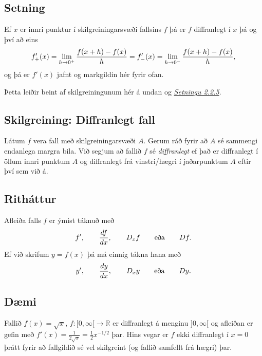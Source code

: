 \documentclass[b5paper,10pt,icelandic]{sphinxmanual}
\begin{document}
\subsection{Setning}
\label{kafli03:id2}
Ef \(x\) er innri punktur í skilgreiningarsvæði fallsins \(f\)
þá er \(f\) diffranlegt í \(x\) þá og því að eins
\begin{gather}
\begin{split}f_+'(x)=\lim_{h\rightarrow 0^+}\frac{f(x+h)-f(x)}{h}
=   f_-'(x)=\lim_{h\rightarrow 0^-}\frac{f(x+h)-f(x)}{h},\end{split}\notag
\end{gather}
og þá er \(f'(x)\) jafnt og markgildin hér fyrir ofan.

Þetta leiðir beint af skilgreiningunum hér á undan og
{\hyperref[kafli02:setning\string-hv\string-markgildi]{\emph{Setningu 2.2.5}}}.


\subsection{Skilgreining: Diffranlegt fall}
\label{kafli03:skilgreining-diffranlegt-fall}\label{kafli03:index-3}
Látum \(f\) vera fall með skilgreiningarsvæði \(A\). Gerum ráð
fyrir að \(A\) sé sammengi endanlega margra bila. Við segjum að
fallið \(f\) sé \emph{diffranlegt} ef það er diffranlegt í öllum innri
punktum \(A\) og diffranlegt frá vinstri/hægri í jaðarpunktum
\(A\) eftir því sem við á.


\subsection{Ritháttur}
\label{kafli03:rithattur}
Afleiða falls \(f\) er ýmist táknuð með
\begin{gather}
\begin{split}f', \qquad \frac {df}{dx}, \qquad D_x f \qquad \text{eða} \qquad Df.\end{split}\notag
\end{gather}
Ef við skrifum \(y=f(x)\) þá má einnig tákna hana með
\begin{gather}
\begin{split}y', \qquad \frac {dy}{dx}, \qquad D_x y \qquad \text{eða} \qquad Dy.\end{split}\notag
\end{gather}

\subsection{Dæmi}
\label{kafli03:id3}
Fallið \(f(x) = \sqrt{x}\), \(f:[0,\infty[\to {{\mathbb  R}}\)
er diffranlegt á menginu \(]0,\infty[\) og afleiðan er gefin með
\(f'(x) = \frac 1{2\sqrt{x}} = \frac 12 x^{-1/2}\) þar. Hins vegar
er \(f\) ekki diffranlegt í \(x=0\) þrátt fyrir að fallgildið sé
vel skilgreint (og fallið samfellt frá hægri) þar.
\end{document}
